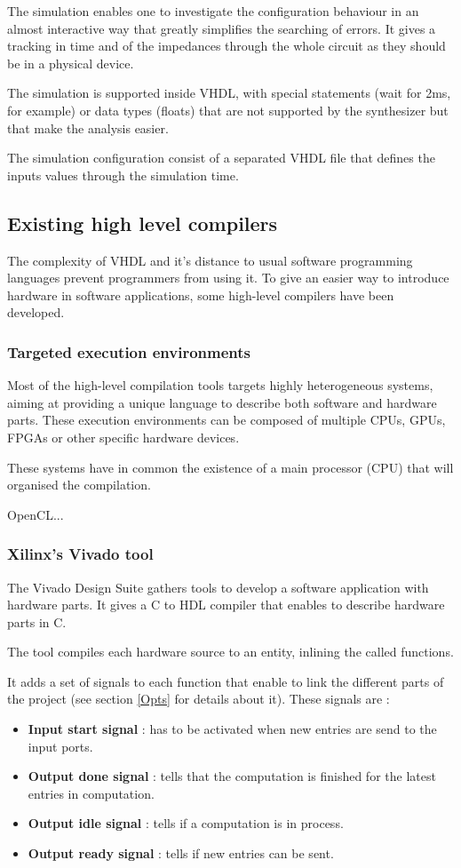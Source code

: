 \documentclass[10pt,a4paper]{article}
\begin{document}
The simulation enables one to investigate the configuration behaviour in an almost interactive way that greatly simplifies the searching of errors. It gives a tracking in time and of the impedances through the whole circuit as they should be in a physical device.

The simulation is supported inside VHDL, with special statements (wait for 2ms, for example) or data types (floats) that are not supported by the synthesizer but that make the analysis easier.

The simulation configuration consist of a separated VHDL file that defines the inputs values through the simulation time.


\subsection{Existing high level compilers}

The complexity of VHDL and it's distance to usual software programming languages prevent programmers from using it.
To give an easier way to introduce hardware in software applications, some high-level compilers have been developed.

\subsubsection{Targeted execution environments}

Most of the high-level compilation tools targets highly heterogeneous systems, aiming at providing a unique language to describe both software and hardware parts. These execution environments can be composed of multiple CPUs, GPUs, FPGAs or other specific hardware devices.

These systems have in common the existence of a main processor (CPU) that will organised the compilation.

OpenCL...

\subsubsection{Xilinx's Vivado tool}

The Vivado Design Suite gathers tools to develop a software application with hardware parts. It gives a C to HDL compiler that enables to describe hardware parts in C.

The tool compiles each hardware source to an entity, inlining the called functions.

It adds a set of signals to each function that enable to link the different parts of the project (see section \ref{Opts} for details about it).
These signals are :
\begin{itemize}
	\item \textbf{Input start signal} : has to be activated when new entries are send to the input ports.
	\item \textbf{Output done signal} : tells that the computation is finished for the latest entries in computation.
	\item \textbf{Output idle signal} : tells if a computation is in process.
	\item \textbf{Output ready signal} : tells if new entries can be sent.
\end{itemize}
\end{document}
